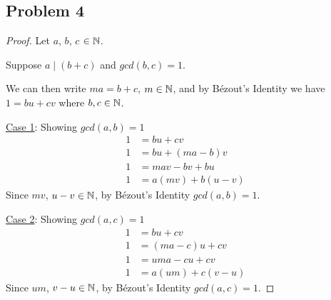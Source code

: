 \documentclass[10pt]{article}
\begin{document}
\subsection*{Problem 4}

\begin{proof}
  Let $a$, $b$, $c$ $\in \mathbb{N}$. \spacing

  \noindent
  Suppose $a \mid (b + c)$ and $gcd(b, c) = 1$.
  \spacing

  \noindent
  We can then write $ma = b + c$, $m \in \mathbb{N}$, and by Bézout's Identity we have $1 = bu + cv$ 
  where $b, c \in \mathbb{N}$.
  \spacing

  \noindent
  \underline{Case 1}: Showing $gcd(a, b) = 1$
  \begin{align*}
    1 &= bu + cv \\
    1 &= bu + (ma - b)v \\
    1 &= mav - bv + bu \\
    1 &= a(mv) + b(u - v)
  \end{align*}
  Since $mv$, $u - v \in \mathbb{N}$, by Bézout's Identity $gcd(a, b) = 1$.
  \spacing

  \noindent
  \underline{Case 2}: Showing $gcd(a, c) = 1$
  \begin{align*}
    1 &= bu + cv \\
    1 &= (ma - c)u + cv \\
    1 &= uma - cu + cv \\
    1 &= a(um) + c(v - u)
  \end{align*}
  Since $um$, $v - u \in \mathbb{N}$, by Bézout's Identity $gcd(a, c) = 1$.
\end{proof}
\end{document}

